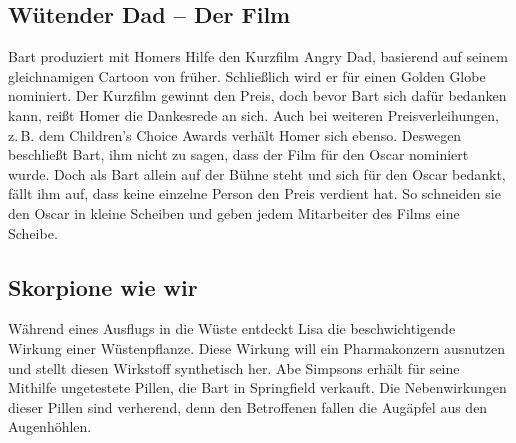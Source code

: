 
\subsection{Wütender Dad -- Der Film}\label{NABF07}
Bart produziert mit Homers Hilfe den Kurzfilm Angry Dad, basierend auf seinem gleichnamigen Cartoon von früher. Schließlich wird er für einen Golden Globe nominiert. Der Kurzfilm gewinnt den Preis, doch bevor Bart sich dafür bedanken kann, reißt Homer die Dankesrede an sich. Auch bei weiteren Preisverleihungen, z.\,B. dem Children's Choice Awards verhält Homer sich ebenso. Deswegen beschließt Bart, ihm nicht zu sagen, dass der Film für den Oscar nominiert wurde. Doch als Bart allein auf der Bühne steht und sich für den Oscar bedankt, fällt ihm auf, dass keine einzelne Person den Preis verdient hat. So schneiden sie den Oscar in kleine Scheiben und geben jedem Mitarbeiter des Films eine Scheibe. 


\subsection{Skorpione wie wir}
Während eines Ausflugs in die Wüste entdeckt Lisa die beschwichtigende Wirkung einer Wü\-sten\-pflan\-ze. Diese Wirkung will ein Pharmakonzern ausnutzen und stellt diesen Wirkstoff synthetisch her. Abe Simpsons erhält für seine Mithilfe ungetestete Pillen, die Bart in Springfield verkauft. Die Nebenwirkungen dieser Pillen sind verherend, denn den Betroffenen fallen die Augäpfel aus den Augenhöhlen.

